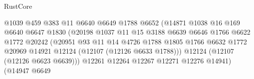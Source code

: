 \begin{lexlean}{RustCore}
\begin{coremodule}
                                          @1039
                                          @459
                                          @383
                                          @11
                                          @6640
                                          @6649
                                          @1788
                                          @6652
                                          (@14871
                                            @1038
                                            @16
                                            @169
                                            @6640
                                            @6647
                                            @1830
                                            (@20198
                                              @1037
                                              @11
                                              @15
                                              @3188
                                              @6639
                                              @6646
                                              @1766
                                              @6622
                                              @1772
                                              @20242
                                              (@20951
                                                @93
                                                @11
                                                @14
                                                @4726
                                                @1788
                                                @1805
                                                @1766
                                                @6632
                                                @1772
                                                @20969
                                                @14921
                                                @12124
                                                (@12107 (@12126 @6633 @1788)))
                                              @12124
                                              (@12107 (@12126 @6623 @6639)))
                                            @12261
                                            @12264
                                            @12267
                                            @12271
                                            @12276
                                            @14941)
                                          (@14947
                                            @6649

\end{coremodule}
\end{lexlean}
